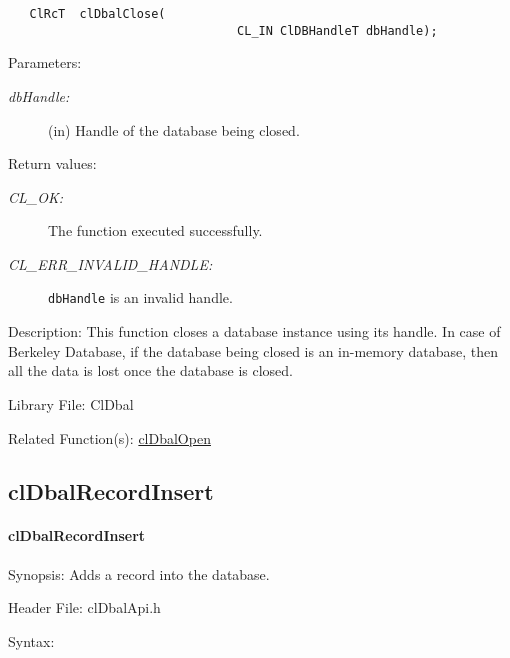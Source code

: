 \begin{flushleft}
\begin{Desc}
\footnotesize\begin{verbatim}   ClRcT  clDbalClose(
                    			CL_IN ClDBHandleT dbHandle);
\end{verbatim}
\normalsize
\end{Desc}
\begin{Desc}
\item[Parameters:]
\begin{description}
\item[{\em db\-Handle:}](in) Handle of the database being closed.\end{description}
\end{Desc}
\begin{Desc}
\item[Return values:]
\begin{description}
\item[{\em CL\_\-OK:}]The function executed successfully. 
\item[{\em CL\_\-ERR\_\-INVALID\_\-HANDLE:}]{\tt{dbHandle}} is an invalid handle.\end{description}
\end{Desc}
\begin{Desc}
\item[Description:]This function closes a database instance using its handle. In case of Berkeley Database, if the database being closed is an in-memory 
database, then all the data is lost once the database is closed.\end{Desc}
\begin{Desc}
\item[Library File:]Cl\-Dbal\end{Desc}
\begin{Desc}
\item[Related Function(s):]\hyperlink{pagedbal103}{cl\-Dbal\-Open} \end{Desc}


\newpage
\subsection{clDbalRecordInsert}
\hypertarget{pagedbal105}{}\paragraph{cl\-Dbal\-Record\-Insert}\label{pagedbal105}
\begin{Desc}
\item[Synopsis:]Adds a record into the database.\end{Desc}
\begin{Desc}
\item[Header File:]clDbalApi.h\end{Desc}
\begin{Desc}
\item[Syntax:]


\end{Desc}
\end{flushleft}
